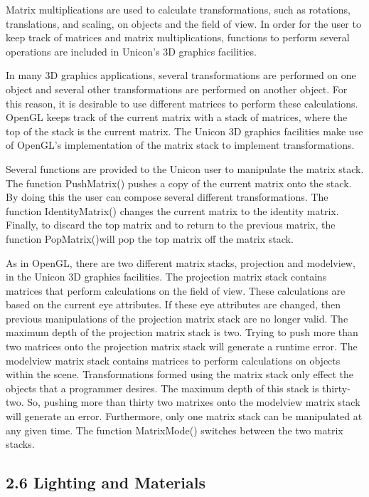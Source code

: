 \documentclass[letterpaper]{article}
\begin{document}
Matrix multiplications are used to calculate transformations, such as
rotations, translations, and scaling, on objects and the field of
view. In order for the user to keep track of matrices and matrix
multiplications, functions to perform several operations are included
in Unicon's 3D graphics facilities.

In many 3D graphics applications, several transformations are
performed on one object and several other transformations are
performed on another object. For this reason, it is desirable to use
different matrices to perform these calculations. OpenGL keeps track
of the current matrix with a stack of matrices, where the top of the
stack is the current matrix. The Unicon 3D graphics facilities make
use of OpenGL's implementation of the matrix stack to implement
transformations.

Several functions are provided to the Unicon user to manipulate the
matrix stack. The function \textsf{PushMatrix()} pushes a copy of the
current matrix onto the stack. By doing this the user can compose
several different transformations. The function
\textsf{IdentityMatrix()} changes the current matrix to the identity
matrix. Finally, to discard the top matrix and to return to the
previous matrix, the function \textsf{PopMatrix()}will pop the top
matrix off the matrix stack.

As in OpenGL, there are two different matrix stacks, projection and
modelview, in the Unicon 3D graphics facilities. The projection matrix
stack contains matrices that perform calculations on the field of
view. These calculations are based on the current eye attributes. If
these eye attributes are changed, then previous manipulations of the
projection matrix stack are no longer valid. The maximum depth of the
projection matrix stack is two. Trying to push more than two matrices
onto the projection matrix stack will generate a runtime error. The
modelview matrix stack contains matrices to perform calculations on
objects within the scene. Transformations formed using the matrix
stack only effect the objects that a programmer desires. The maximum
depth of this stack is thirty-two. So, pushing more than thirty two
matrixes onto the modelview matrix stack will generate an
error. Furthermore, only one matrix stack can be manipulated at any
given time. The function \textsf{MatrixMode() }switches between the
two matrix stacks.

\subsection[2.6 Lighting and Materials]{2.6 Lighting and Materials}
\end{document}
